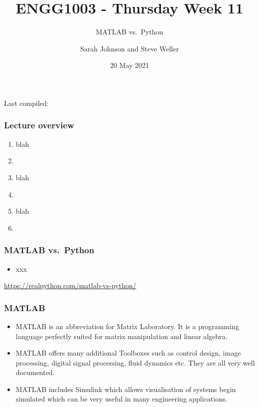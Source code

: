 \documentclass[english,14pt]{beamer}
\title{ENGG1003 - Thursday Week 11}
\subtitle{MATLAB vs.~Python}
\author{Sarah Johnson and Steve Weller}
\institute{University of Newcastle}
\date{20 May 2021}
\begin{document}
\begin{flushleft}
{\scriptsize Last compiled:~\DTMnow}
\vspace*{-5mm}
\end{flushleft}
\framebreak


\begin{frame}[fragile]

\frametitle{Lecture overview}
\begin{enumerate}
	\item blah

	\item[]

	\item blah

	\item[]
	
	\item blah

	\item[]

\end{enumerate}

\end{frame}


\begin{frame}[fragile]

\frametitle{MATLAB vs.~Python}

\begin{itemize}
	\item xxx
\end{itemize}

\href{https://realpython.com/matlab-vs-python/}{https://realpython.com/matlab-vs-python/}
\end{frame}


\begin{frame}[fragile]

\frametitle{MATLAB}

\begin{itemize}
	\item MATLAB is an abbreviation for Matrix Laboratory. It is a programming language perfectly suited for matrix manipulation and linear algebra.
	\item MATLAB offers many additional Toolboxes such as control design, image processing, digital signal processing, fluid dynamics etc. They are all very well documented.
	\item MATLAB includes Simulink which allows visualisation of systems begin simulated which can be very useful in many engineering applications.
\end{itemize}

\end{frame}
\end{document}
